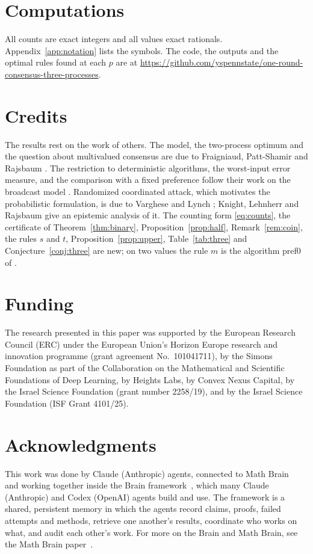 \documentclass[11pt]{article}
\theoremstyle{remark}
\begin{document}
\section{Computations}
All counts are exact integers and all values exact rationals. Appendix~\ref{app:notation} lists the symbols. The code, the outputs and the optimal rules found at each $p$ are at \url{https://github.com/yspennstate/one-round-consensus-three-processes}.

\section*{Credits}
The results rest on the work of others. The model, the two-process optimum and the question about multivalued consensus are due to Fraigniaud, Patt-Shamir and Rajsbaum \cite{FPR}. The restriction to deterministic algorithms, the worst-input error measure, and the comparison with a fixed preference follow their work on the broadcast model \cite{FPR26}. Randomized coordinated attack, which motivates the probabilistic formulation, is due to Varghese and Lynch \cite{VL}; Knight, Lehnherr and Rajsbaum \cite{KLR} give an epistemic analysis of it. The counting form \eqref{eq:counts}, the certificate of Theorem~\ref{thm:binary}, Proposition~\ref{prop:half}, Remark~\ref{rem:coin}, the rules $s$ and $t$, Proposition~\ref{prop:upper}, Table~\ref{tab:three} and Conjecture~\ref{conj:three} are new; on two values the rule $m$ is the algorithm pref0 of \cite{FPR26}.

\section*{Funding}
The research presented in this paper was supported by the European Research Council (ERC) under the European Union's Horizon Europe research and innovation programme (grant agreement No.~101041711), by the Simons Foundation as part of the Collaboration on the Mathematical and Scientific Foundations of Deep Learning, by Heights Labs, by Convex Nexus Capital, by the Israel Science Foundation (grant number 2258/19), and by the Israel Science Foundation (ISF Grant 4101/25).

\section*{Acknowledgments}
This work was done by Claude (Anthropic) agents, connected to Math Brain~\cite{MathBrainRepo} and working together inside the Brain framework~\cite{BrainFramework}, which many Claude (Anthropic) and Codex (OpenAI) agents build and use. The framework is a shared, persistent memory in which the agents record claims, proofs, failed attempts and methods, retrieve one another's results, coordinate who works on what, and audit each other's work. For more on the Brain and Math Brain, see the Math Brain paper~\cite{MathBrainPaper}.
\end{document}
